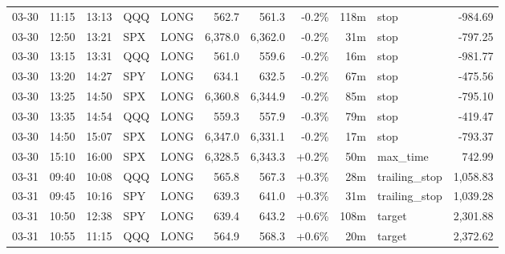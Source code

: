 \documentclass[11pt,a4paper,twoside]{article}
\begin{document}
\begin{center}
\begin{longtable}{>{\color{txtmain}}l l l l l r r r r >{\color{txtmain}}l r}
03-30 & 11:15 & 13:13 & QQQ & LONG & 562.7 & 561.3 & \textcolor{lossred}{-0.2\%} & 118m & stop & \textcolor{lossred}{-984.69} \\
03-30 & 12:50 & 13:21 & SPX & LONG & 6,378.0 & 6,362.0 & \textcolor{lossred}{-0.2\%} & 31m & stop & \textcolor{lossred}{-797.25} \\
03-30 & 13:15 & 13:31 & QQQ & LONG & 561.0 & 559.6 & \textcolor{lossred}{-0.2\%} & 16m & stop & \textcolor{lossred}{-981.77} \\
03-30 & 13:20 & 14:27 & SPY & LONG & 634.1 & 632.5 & \textcolor{lossred}{-0.2\%} & 67m & stop & \textcolor{lossred}{-475.56} \\
03-30 & 13:25 & 14:50 & SPX & LONG & 6,360.8 & 6,344.9 & \textcolor{lossred}{-0.2\%} & 85m & stop & \textcolor{lossred}{-795.10} \\
03-30 & 13:35 & 14:54 & QQQ & LONG & 559.3 & 557.9 & \textcolor{lossred}{-0.3\%} & 79m & stop & \textcolor{lossred}{-419.47} \\
03-30 & 14:50 & 15:07 & SPX & LONG & 6,347.0 & 6,331.1 & \textcolor{lossred}{-0.2\%} & 17m & stop & \textcolor{lossred}{-793.37} \\
03-30 & 15:10 & 16:00 & SPX & LONG & 6,328.5 & 6,343.3 & \textcolor{wingreen}{+0.2\%} & 50m & max\_time & \textcolor{wingreen}{742.99} \\
03-31 & 09:40 & 10:08 & QQQ & LONG & 565.8 & 567.3 & \textcolor{wingreen}{+0.3\%} & 28m & trailing\_stop & \textcolor{wingreen}{1,058.83} \\
03-31 & 09:45 & 10:16 & SPY & LONG & 639.3 & 641.0 & \textcolor{wingreen}{+0.3\%} & 31m & trailing\_stop & \textcolor{wingreen}{1,039.28} \\
03-31 & 10:50 & 12:38 & SPY & LONG & 639.4 & 643.2 & \textcolor{wingreen}{+0.6\%} & 108m & target & \textcolor{wingreen}{2,301.88} \\
03-31 & 10:55 & 11:15 & QQQ & LONG & 564.9 & 568.3 & \textcolor{wingreen}{+0.6\%} & 20m & target & \textcolor{wingreen}{2,372.62} \\
\end{longtable}
\end{center}
\clearpage
\end{document}
